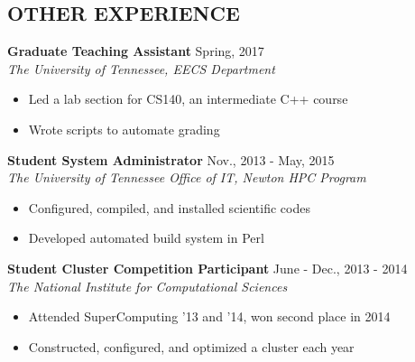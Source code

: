 \documentclass[margin,11pt]{res} %
\begin{document}
\begin{resume}
\section{OTHER EXPERIENCE}

  {\textbf{Graduate Teaching Assistant}} \hfill Spring, 2017 \\
   \textit{The University of Tennessee, EECS Department}
    \begin{itemize} \itemsep -2pt
      \item Led a lab section for CS140, an intermediate C++ course
      \item Wrote scripts to automate grading
    \end{itemize}

  {\textbf{Student System Administrator}} \hfill Nov., 2013 - May, 2015 \\
   \textit{The University of Tennessee Office of IT, Newton HPC Program}
    \begin{itemize} \itemsep -2pt
      \item Configured, compiled, and installed scientific codes
      \item Developed automated build system in Perl
    \end{itemize}

  {\textbf{Student Cluster Competition Participant}} \hfill June - Dec., 2013 - 2014 \\
   \textit{The National Institute for Computational Sciences}
    \begin{itemize} \itemsep -2pt
      \item Attended SuperComputing '13 and '14, won second place in 2014
      \item Constructed, configured, and optimized a cluster each year
    \end{itemize}


\end{resume}
\end{document}
